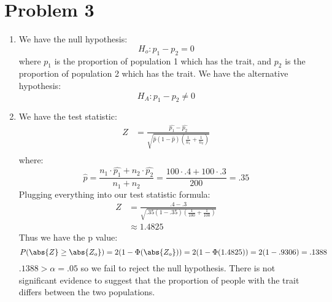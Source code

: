 \documentclass{article}
\begin{document}
\section*{Problem 3}
\begin{enumerate}
\item We have the null hypothesis: \\
\[
H_o: p_1 - p_2 = 0
\]
where $p_1$ is the proportion of population 1 which has the trait, and $p_2$ is the proportion of population 2 which has the trait. We have the alternative hypothesis: \\
\[
H_A: p_1 - p_2 \neq 0
\]
\item We have the test statistic: \\
\begin{align*}
Z &= \frac{\hat{p_1} - \hat{p_2}}{\sqrt{\hat{p}(1 - \hat{p})(\frac{1}{n_1} + \frac{1}{n_2})}} \\
\end{align*}
where: \\
\[
\hat{p} = \frac{n_1 \cdot \hat{p_1} + n_2 \cdot \hat{p_2}}{n_1 + n_2} = \frac{100 \cdot .4 + 100 \cdot .3}{200} = .35
\]
Plugging everything into our test statistic formula: \\
\begin{align*}
Z &= \frac{.4 - .3}{\sqrt{.35(1 - .35)(\frac{1}{100} + \frac{1}{100})}} \\
&\approx 1.4825
\end{align*}
Thus we have the p value: \\
\[
P(\abs{Z} \geq \abs{Z_o}) = 2(1 - \Phi(\abs{Z_o})) = 2(1 - \Phi(1.4825)) = 2(1 - .9306) = .1388
\]
$.1388 > \alpha = .05$ so we fail to reject the null hypothesis. There is not significant evidence to suggest that the proportion of people with the trait differs between the two populations. \\

\end{enumerate}
\end{document}
